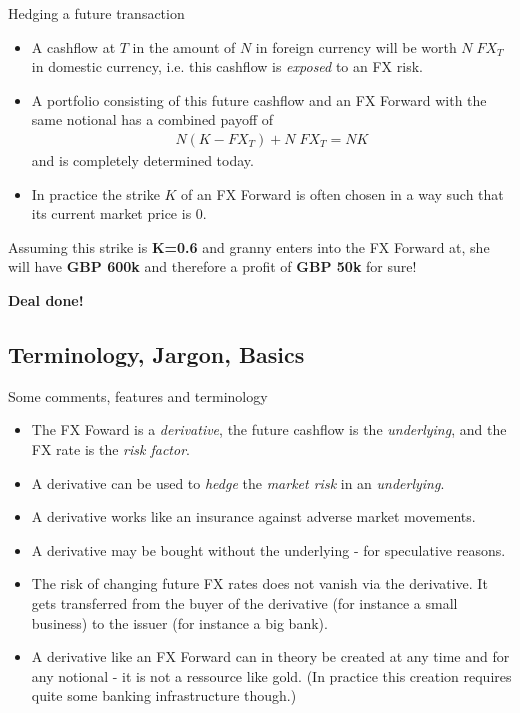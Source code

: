 \documentclass[t]{beamer}
\begin{document}
\begin{frame}{Hedging a future transaction}
	\begin{itemize}
		\item
			A cashflow at $T$ in the amount of $N$ in foreign currency will be worth $N \; FX_{T} $ in domestic currency, i.e. this cashflow is \emph{exposed} to an FX risk.
		\item
			A portfolio consisting of this future cashflow and an FX Forward with the same notional has a combined payoff of
			\begin{align*}
				N(K-FX_T)+N \; FX_T = N K
			\end{align*}
			and is completely determined today.
		\item
			In practice the strike $K$ of an FX Forward is often chosen in a way such that its current market price is $0$.
	\end{itemize}

	Assuming this strike is \textbf{K=0.6} and granny enters into the FX Forward at, she will have \textbf{GBP 600k} and therefore a profit of \textbf{GBP 50k} for sure!
	\begin{center}
		\textbf{Deal done!}
	\end{center}	
\end{frame}

\subsection{Terminology, Jargon, Basics}

\begin{frame}{Some comments, features and terminology}
	\begin{itemize}
		\item
			The FX Foward is a \emph{derivative}, the future cashflow is the \emph{underlying}, and the FX rate is the \emph{risk factor}.
		\item
			A derivative can be used to \emph{hedge} the \emph{market risk} in an \emph{underlying}. 
		\item
			A derivative works like an insurance against adverse market movements.
		\item
			A derivative may be bought without the underlying - for speculative reasons.
		\item
			The risk of changing future FX rates does not vanish via the derivative. It gets transferred from the buyer of the derivative (for instance a small business) to the issuer (for instance a big bank).
		\item
			A derivative like an FX Forward can in theory be created at any time and for any notional - it is not a ressource like gold. (In practice this creation requires quite some banking infrastructure though.)
	\end{itemize}
\end{frame}
\end{document}
